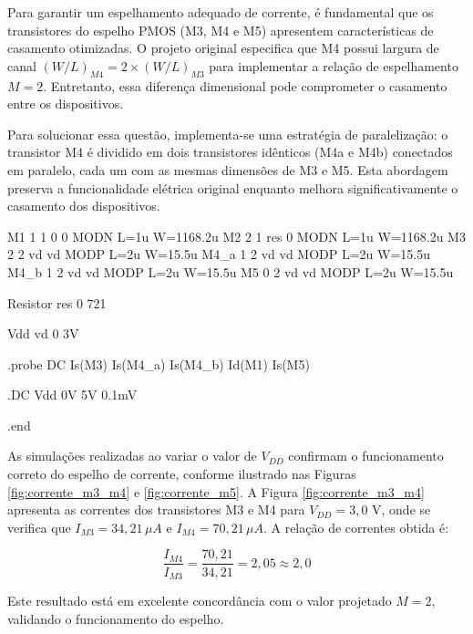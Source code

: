 \documentclass[12pt,a4paper]{article}
\begin{document}
Para garantir um espelhamento adequado de corrente, é fundamental que os transistores do espelho PMOS (M3, M4 e M5) apresentem características de casamento otimizadas. O projeto original especifica que M4 possui largura de canal $(W/L)_{M4} = 2 \times (W/L)_{M3}$ para implementar a relação de espelhamento $M = 2$. Entretanto, essa diferença dimensional pode comprometer o casamento entre os dispositivos.

Para solucionar essa questão, implementa-se uma estratégia de paralelização: o transistor M4 é dividido em dois transistores idênticos (M4a e M4b) conectados em paralelo, cada um com as mesmas dimensões de M3 e M5. Esta abordagem preserva a funcionalidade elétrica original enquanto melhora significativamente o casamento dos dispositivos.

\begin{codeblock}[title={Arquivo de simulação da fonte de corrente}]

M1 1 1 0 0 MODN L=1u W=1168.2u
M2 2 1 res 0 MODN L=1u W=1168.2u
M3 2 2 vd vd MODP L=2u W=15.5u
M4_a 1 2 vd vd MODP L=2u W=15.5u
M4_b 1 2 vd vd MODP L=2u W=15.5u
M5 0 2 vd vd MODP L=2u W=15.5u

Resistor res 0 721

Vdd vd 0 3V

.probe DC Is(M3) Is(M4_a) Is(M4_b) Id(M1) Is(M5)

.DC Vdd 0V  5V  0.1mV

.end
\end{codeblock}

As simulações realizadas ao variar o valor de $V_{DD}$ confirmam o funcionamento correto do espelho de corrente, conforme ilustrado nas Figuras \ref{fig:corrente_m3_m4} e \ref{fig:corrente_m5}. A Figura \ref{fig:corrente_m3_m4} apresenta as correntes dos transistores M3 e M4 para $V_{DD} = 3{,}0$ V, onde se verifica que $I_{M3} = 34{,}21\,\mu A$ e $I_{M4} = 70{,}21\,\mu A$. A relação de correntes obtida é:

\begin{equation}
\frac{I_{M4}}{I_{M3}} = \frac{70{,}21}{34{,}21} = 2{,}05 \approx 2{,}0
\end{equation}

Este resultado está em excelente concordância com o valor projetado $M = 2$, validando o funcionamento do espelho.
\end{document}
